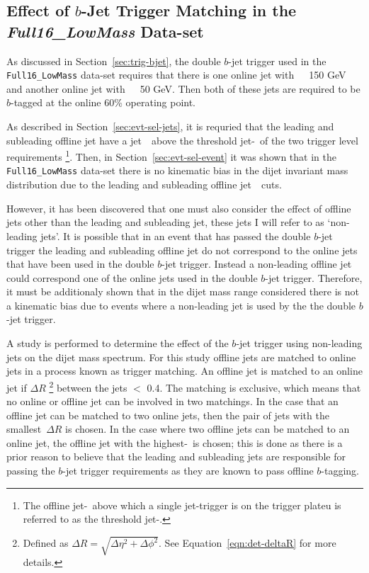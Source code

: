\subsection{Effect of $b$-Jet Trigger Matching in the \textit{Full16\_LowMass} Data-set}
\label{sec:evt-sel_btrigMatch}

As discussed in Section~\ref{sec:trig-bjet},
the double $b$-jet trigger used in the \verb|Full16_LowMass| data-set
requires that there is one online jet with~\pT~\gt~150 GeV
and another online jet with~\pT~\gt~50 GeV.
Then both of these jets are required to be $b$-tagged at the online 60\% operating point.

As described in Section~\ref{sec:evt-sel-jets}, it is requried that the leading and subleading offline jet have a jet~\pT~above
the threshold jet-\pT~of the two trigger level requirements
\footnote{The offline jet-\pT~above which a single jet-trigger is on the trigger plateu is referred to as the threshold jet-\pT.}.
Then, in Section~\ref{sec:evt-sel-event} it was shown that in the \verb|Full16_LowMass| data-set
there is no kinematic bias in the dijet invariant mass distribution due to the leading and subleading offline jet~\pT~cuts.

However, it has been discovered that one must also consider the effect of offline jets other than the leading and subleading jet,
these jets I will refer to as `non-leading jets'.
It is possible that in an event that has passed the double $b$-jet trigger the
leading and subleading offline jet do not correspond to the
online jets that have been used in the double $b$-jet trigger.
Instead a non-leading offline jet could correspond one of the online jets used in the double $b$-jet trigger.
Therefore, it must be additionaly shown that in the dijet mass range considered there is not a kinematic bias
due to events where a non-leading jet is used by the the double $b$-jet trigger.

A study is performed to determine the effect of the $b$-jet trigger using non-leading jets on the dijet mass spectrum.
For this study offline jets are matched to online jets in a process known as trigger matching.
An offline jet is matched to an online jet if $\Delta R$
\footnote{Defined as $\Delta R = \sqrt{\Delta\eta^{2} + \Delta\phi^{2}}$. See Equation~\ref{eqn:det-deltaR} for more details.}
between the jets $<$ 0.4.
The matching is exclusive, which means that no online or offline jet can be involved in two matchings.
In the case that an offline jet can be matched to two online jets, then the pair of jets with the smallest~$\Delta R$ is chosen.
In the case where two offline jets can be matched to an online jet, the offline jet with the highest-\pT~is chosen;
this is done as there is a prior reason to believe that the leading and subleading jets are responsible
for passing the $b$-jet trigger requirements as they are known to pass offline $b$-tagging.

